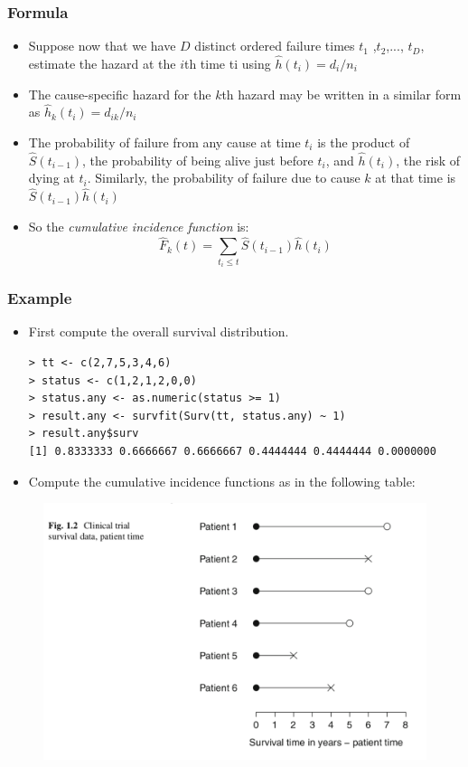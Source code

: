 \documentclass{beamer}
\newcommand{\empr}[1]{{\emph{\color{red}#1}}}
\begin{document}
\pagebreak
\begin{frame}
\frametitle{Formula}
\begin{itemize}
\item Suppose now that we have $D$ distinct ordered failure times $t_1$ ,$t_2$,..., $t_D$, estimate the hazard at the $i$th time ti using $\hat{h}(t_i)=d_i/n_i$
\item The cause-specific hazard for the $k$th hazard may be written in a similar form as ${\hat{h}}_k(t_i) = d_{ik}/n_i$
\item The probability of failure from any cause at time $t_i$ is the product of $\hat{S}(t_{i-1})$, the probability of being alive just before $t_i$, and $\hat{h}(t_i)$, the risk of dying at $t_i$. Similarly, the probability of failure due to cause $k$ at that time is $\hat{S}(t_{i-1})\hat{h}(t_i)$
\item So the \empr{cumulative incidence function} is:	
\begin{equation}
{\hat{F}}_k(t) = \sum\limits_{t_i \le t}^{}{\hat{S}(t_{i-1})\hat{h}(t_i)}                                
\end{equation}
\end{itemize}
\end{frame}

\pagebreak
\begin{frame}[fragile]
\frametitle{Example}
\begin{itemize}
\item First compute the overall survival distribution.
\begin{Verbatim}
> tt <- c(2,7,5,3,4,6)
> status <- c(1,2,1,2,0,0)   
> status.any <- as.numeric(status >= 1)
> result.any <- survfit(Surv(tt, status.any) ~ 1)
> result.any$surv
[1] 0.8333333 0.6666667 0.6666667 0.4444444 0.4444444 0.0000000
\end{Verbatim}     
\item Compute the cumulative incidence functions as in the following table:                      
\end{itemize}
\begin{figure}[h!]
\includegraphics[scale = .4]{002.png}
\end{figure}
\end{frame}
\end{document}
